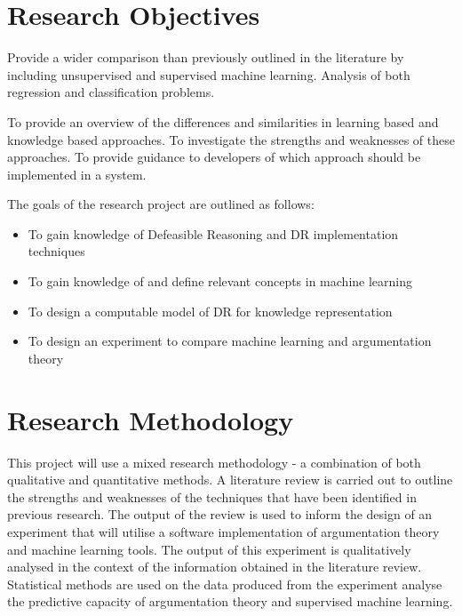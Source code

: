
\section{Research Objectives}


Provide a wider comparison than previously outlined in the literature by including unsupervised and supervised machine learning. Analysis of both regression and classification problems.

To provide an overview of the differences and similarities in learning based and knowledge based approaches. To investigate the strengths and weaknesses of these approaches. To provide guidance to developers of which approach should be implemented in a system.

The goals of the research project are outlined as follows:

\begin{itemize}

  \item To gain knowledge of Defeasible Reasoning and DR implementation techniques
  \item To gain knowledge of and define relevant concepts in machine learning
  \item To design a computable model of DR for knowledge representation
  \item To design an experiment to compare machine learning and argumentation theory 

\end{itemize}


\section{Research Methodology}


This project will use a mixed research methodology - a combination of both qualitative and quantitative methods. A literature review is carried out to outline the strengths and weaknesses of the techniques that have been identified in previous research. The output of the review is used to inform the design of an experiment that will utilise a software implementation of argumentation theory and machine learning tools. The output of this experiment is qualitatively analysed in the context of the information obtained in the literature review. Statistical methods are used on the data produced from the experiment analyse the predictive capacity of argumentation theory and supervised machine learning. 

